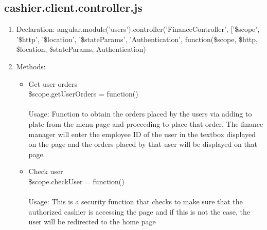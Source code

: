 \documentclass[a4paper,12pt]{article}
\begin{document}
\subsection{cashier.client.controller.js}
\begin{enumerate}
\item Declaration: angular.module('users').controller('FinanceController', ['\$scope', '\$http', '\$location', '\$stateParams', 'Authentication',
    function(\$scope, \$http, \$location, \$stateParams, Authentication)  
\item Methods:
	\begin{itemize}
		\item  Get user orders \\  \$scope.getUserOrders = function() 
		\\ \\ Usage: Function to obtain the orders placed by the users via adding to plate from the menu page and proceeding to place that order. The finance manager will enter the employee ID of the user in the textbox displayed on the page and the orders placed by that user will be displayed on that page.
		\item Check user \\ \$scope.checkUser = function() 
	\\ \\ Usage: This is a security function that checks to make sure that the authorized cashier is accessing the page and if this is not the case, the user will be redirected to the home page
	\end{itemize}	
\end{enumerate}
\end{document}
